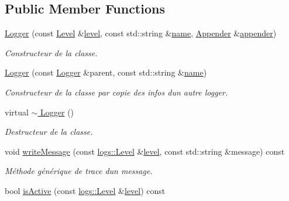 \subsection*{Public Member Functions}
\begin{DoxyCompactItemize}
\item 
\hyperlink{classlogs_1_1Logger_a46f087c40eefd95ab5092137592fd102}{Logger} (const \hyperlink{classlogs_1_1Level}{Level} \&\hyperlink{classlogs_1_1Logger_a94c013a945cf805fbbc8aa763f73f107}{level}, const std\+::string \&\hyperlink{classlogs_1_1Logger_a6706ac94e219fd82c6049e376805202e}{name}, \hyperlink{classlogs_1_1Appender}{Appender} \&\hyperlink{classlogs_1_1Logger_a48d911418afc6c935cae1e71ed771dee}{appender})
\begin{DoxyCompactList}\small\item\em Constructeur de la classe. \end{DoxyCompactList}\item 
\hyperlink{classlogs_1_1Logger_a204a68a5f81fbfb74aaee18d208b021f}{Logger} (const \hyperlink{classlogs_1_1Logger}{Logger} \&parent, const std\+::string \&\hyperlink{classlogs_1_1Logger_a6706ac94e219fd82c6049e376805202e}{name})
\begin{DoxyCompactList}\small\item\em Constructeur de la classe par copie des infos d\textquotesingle{}un autre logger. \end{DoxyCompactList}\item 
\mbox{\label{classlogs_1_1Logger_aef85cd3e56cb0da955501622da81ff80}} 
virtual \hyperlink{classlogs_1_1Logger_aef85cd3e56cb0da955501622da81ff80}{$\sim$ Logger} ()
\begin{DoxyCompactList}\small\item\em Destructeur de la classe. \end{DoxyCompactList}\item 
void \hyperlink{classlogs_1_1Logger_afa535aaf4891e02c4ff7f84d372b5b1b}{write\+Message} (const \hyperlink{classlogs_1_1Level}{logs\+::\+Level} \&\hyperlink{classlogs_1_1Logger_a94c013a945cf805fbbc8aa763f73f107}{level}, const std\+::string \&message) const
\begin{DoxyCompactList}\small\item\em Méthode générique de trace d\textquotesingle{}un message. \end{DoxyCompactList}\item 
bool \hyperlink{classlogs_1_1Logger_a13e5a43ff9ecfe978afcd4443be1b32b}{is\+Active} (const \hyperlink{classlogs_1_1Level}{logs\+::\+Level} \&\hyperlink{classlogs_1_1Logger_a94c013a945cf805fbbc8aa763f73f107}{level}) const

\end{DoxyCompactItemize}
